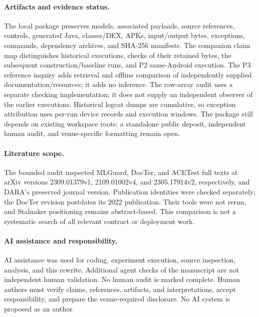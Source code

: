 \documentclass[10pt,twocolumn,letterpaper]{article}
\begin{document}
\paragraph{Artifacts and evidence status.}
The local package preserves models, associated payloads, source references, controls, generated Java, classes/DEX, APKs, input/output bytes, exceptions, commands, dependency archives, and SHA-256 manifests. The companion claim map distinguishes historical executions, checks of their retained bytes, the subsequent construction/baseline runs, and P2 same-Android execution. The P3 reference inquiry adds retrieval and offline comparison of independently supplied documentation/resources; it adds no inference. The raw-array audit uses a separate checking implementation; it does not supply an independent observer of the earlier executions. Historical logcat dumps are cumulative, so exception attribution uses per-run device records and execution windows. The package still depends on existing workspace roots; a standalone public deposit, independent human audit, and venue-specific formatting remain open.

\paragraph{Literature scope.}
The bounded audit inspected MLGuard, DocTer, and ACETest full texts at arXiv versions 2309.01379v1, 2109.01002v4, and 2305.17914v2, respectively, and DARA's preserved journal version. Publication identities were checked separately; the DocTer revision postdates its 2022 publication. Their tools were not rerun, and Stalnaker positioning remains abstract-based. This comparison is not a systematic search of all relevant contract or deployment work.

\paragraph{AI assistance and responsibility.}
AI assistance was used for coding, experiment execution, source inspection, analysis, and this rewrite. Additional agent checks of the manuscript are not independent human validation. No human audit is marked complete. Human authors must verify claims, references, artifacts, and interpretations, accept responsibility, and prepare the venue-required disclosure. No AI system is proposed as an author.
\end{document}
